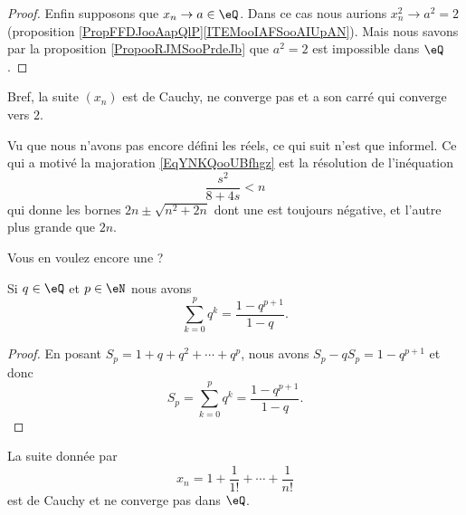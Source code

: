 \begin{proof}
    Enfin supposons que \( x_n\to a\in \eQ\). Dans ce cas nous aurions \( x_n^2\to a^2=2\) (proposition \ref{PropFFDJooAapQlP}\ref{ITEMooIAFSooAIUpAN}). Mais nous savons par la proposition \ref{PropooRJMSooPrdeJb} que \( a^2=2\) est impossible dans \( \eQ\).
\end{proof}

Bref, la suite \( (x_n)\) est de Cauchy, ne converge pas et a son carré qui converge vers \( 2\).

\begin{remark}\label{RemUZCAooWNogzI}
    Vu que nous n'avons pas encore défini les réels, ce qui suit n'est que informel. Ce qui a motivé la majoration \eqref{EqYNKQooUBfhgz} est la résolution de l'inéquation
    \begin{equation}
        \frac{ s^2 }{ 8+4s }<n
    \end{equation}
    qui donne les bornes \( 2n\pm\sqrt{n^2+2n}\) dont une est toujours négative, et l'autre plus grande que \( 2n\).
\end{remark}    

Vous en voulez encore une ?

\begin{lemma}      \label{LEMooOTVUooImvusn}
    Si \( q\in \eQ\) et \( p\in \eN\) nous avons
    \begin{equation}
        \sum_{k=0}^pq^k=\frac{ 1-q^{p+1} }{ 1-q }.
    \end{equation}
\end{lemma}

\begin{proof}
    En posant \( S_p=1+q+q^2+\cdots +q^{p}\), nous avons $S_p-qS_p=1-q^{p+1}$ et donc
    \begin{equation}
        S_p=\sum_{k=0}^pq^k=\frac{ 1-q^{p+1} }{ 1-q }.
    \end{equation}
\end{proof}

\begin{proposition}
    La suite donnée par
    \begin{equation}
        x_n=1+\frac{ 1 }{ 1! }+\cdots +\frac{1}{ n! }
    \end{equation}
    est de Cauchy et ne converge pas dans \( \eQ\).
\end{proposition}

